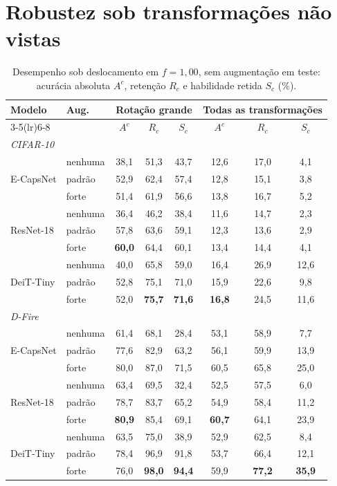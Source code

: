 \section{Robustez sob transformações não vistas}
\label{sec:res:robust}

\begin{table}[htb]
  \centering
  \caption{Desempenho sob deslocamento em $f = 1{,}00$, sem augmentação em
  teste: acurácia absoluta $A^{c}$, retenção $R_c$ e habilidade retida $S_c$ (\%).}
  \label{tab:res-robust}
  \footnotesize
  \begin{tabular}{llcccccc}
    \toprule
    \multirow{2}{*}{Modelo} & \multirow{2}{*}{Aug.}
      & \multicolumn{3}{c}{Rotação grande} & \multicolumn{3}{c}{Todas as transformações} \\
    \cmidrule(lr){3-5}\cmidrule(lr){6-8}
     & & $A^{c}$ & $R_c$ & $S_c$ & $A^{c}$ & $R_c$ & $S_c$ \\
    \midrule
    \multicolumn{8}{l}{\textit{CIFAR-10}} \\
    \multirow{3}{*}{E-CapsNet}
      & nenhuma & 38,1 & 51,3 & 43,7 & 12,6 & 17,0 & 4,1 \\
      & padrão  & 52,9 & 62,4 & 57,4 & 12,8 & 15,1 & 3,8 \\
      & forte   & 51,4 & 61,9 & 56,6 & 13,8 & 16,7 & 5,2 \\
    \multirow{3}{*}{ResNet-18}
      & nenhuma & 36,4 & 46,2 & 38,4 & 11,6 & 14,7 & 2,3 \\
      & padrão  & 57,8 & 63,6 & 59,1 & 12,3 & 13,6 & 2,9 \\
      & forte   & \textbf{60,0} & 64,4 & 60,1 & 13,4 & 14,4 & 4,1 \\
    \multirow{3}{*}{DeiT-Tiny}
      & nenhuma & 40,0 & 65,8 & 59,0 & 16,4 & 26,9 & 12,6 \\
      & padrão  & 52,8 & 75,1 & 71,0 & 15,9 & 22,6 & 9,8 \\
      & forte   & 52,0 & \textbf{75,7} & \textbf{71,6} & \textbf{16,8} & 24,5 & 11,6 \\
    \midrule
    \multicolumn{8}{l}{\textit{D-Fire}} \\
    \multirow{3}{*}{E-CapsNet}
      & nenhuma & 61,4 & 68,1 & 28,4 & 53,1 & 58,9 & 7,7 \\
      & padrão  & 77,6 & 82,9 & 63,2 & 56,1 & 59,9 & 13,9 \\
      & forte   & 80,0 & 87,0 & 71,5 & 60,5 & 65,8 & 25,0 \\
    \multirow{3}{*}{ResNet-18}
      & nenhuma & 63,4 & 69,5 & 32,4 & 52,5 & 57,5 & 6,0 \\
      & padrão  & 78,7 & 83,7 & 65,2 & 54,9 & 58,4 & 11,2 \\
      & forte   & \textbf{80,9} & 85,4 & 69,1 & \textbf{60,7} & 64,1 & 23,9 \\
    \multirow{3}{*}{DeiT-Tiny}
      & nenhuma & 63,5 & 75,0 & 38,9 & 52,9 & 62,5 & 8,4 \\
      & padrão  & 78,4 & 96,9 & 91,8 & 53,7 & 66,4 & 12,1 \\
      & forte   & 76,0 & \textbf{98,0} & \textbf{94,4} & 59,9 & \textbf{77,2} & \textbf{35,9} \\
    \bottomrule
  \end{tabular}
\end{table}

